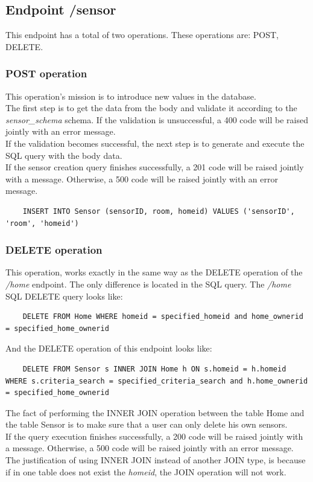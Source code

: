 \documentclass[a4paper,12pt]{article}
\begin{document}
\subsection*{Endpoint /sensor}
This endpoint has a total of two operations. These operations are: POST, DELETE.
\subsubsection*{POST operation}
This operation's mission is to introduce new values in the database.\\
The first step is to get the data from the body and validate it according to the \textit{sensor\_schema} schema. If the validation is unsuccessful, a 400 code will be raised jointly with an error message.\\
If the validation becomes successful, the next step is to generate and execute the SQL query with the body data.\\
If the sensor creation query finishes successfully, a 201 code will be raised jointly with a message. Otherwise, a 500 code will be raised jointly with an error message.
\begin{lstlisting}
    INSERT INTO Sensor (sensorID, room, homeid) VALUES ('sensorID', 'room', 'homeid')
\end{lstlisting}
\subsubsection*{DELETE operation}
This operation, works exactly in the same way as the DELETE operation of the \textit{/home} endpoint. The only difference is located in the SQL query. The \textit{/home} SQL DELETE query looks like:
\begin{lstlisting}
    DELETE FROM Home WHERE homeid = specified_homeid and home_ownerid = specified_home_ownerid
\end{lstlisting}
And the DELETE operation of this endpoint looks like:
\begin{lstlisting}
    DELETE FROM Sensor s INNER JOIN Home h ON s.homeid = h.homeid WHERE s.criteria_search = specified_criteria_search and h.home_ownerid = specified_home_ownerid
\end{lstlisting}
The fact of performing the INNER JOIN operation between the table Home and the table Sensor is to make sure that a user can only delete his own sensors.\\
If the query execution finishes successfully, a 200 code will be raised jointly with a message. Otherwise, a 500 code will be raised jointly with an error message.\\
The justification of using INNER JOIN instead of another JOIN type, is because if in one table does not exist the \textit{homeid}, the JOIN operation will not work.
\end{document}
